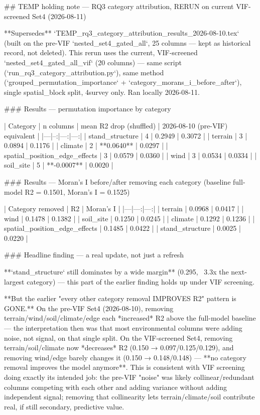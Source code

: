 ## TEMP holding note — RQ3 category attribution, RERUN on current VIF-screened Set4 (2026-08-11)

**Supersedes** `TEMP_rq3_category_attribution_results_2026-08-10.tex` (built on the pre-VIF
`nested_set4_gated_all`, 25 columns — kept as historical record, not deleted). This rerun uses
the current, VIF-screened `nested_set4_gated_all_vif` (20 columns) — same script
(`run_rq3_category_attribution.py`), same method (`grouped_permutation_importance` +
`category_morans_i_before_after`), single spatial_block split, 4survey only. Ran locally
2026-08-11.

### Results — permutation importance by category

| Category | n columns | mean R2 drop (shuffled) | 2026-08-10 (pre-VIF) equivalent |
|---|--:|---:|---:|
| stand_structure | 4 | 0.2949 | 0.3072 |
| terrain | 3 | 0.0894 | 0.1176 |
| climate | 2 | **0.0640** | 0.0297 |
| spatial_position_edge_effects | 3 | 0.0579 | 0.0360 |
| wind | 3 | 0.0534 | 0.0334 |
| soil_site | 5 | **-0.0007** | 0.0020 |

### Results — Moran's I before/after removing each category (baseline full-model R2 = 0.1501, Moran's I = 0.1525)

| Category removed | R2 | Moran's I |
|---|---:|---:|
| terrain | 0.0968 | 0.0417 |
| wind | 0.1478 | 0.1382 |
| soil_site | 0.1250 | 0.0245 |
| climate | 0.1292 | 0.1236 |
| spatial_position_edge_effects | 0.1485 | 0.0422 |
| stand_structure | 0.0025 | 0.0220 |

### Headline finding — a real update, not just a refresh

**`stand_structure` still dominates by a wide margin** (0.295, ~3.3x the next-largest category) —
this part of the earlier finding holds up under VIF screening.

**But the earlier "every other category removal IMPROVES R2" pattern is GONE.** On the pre-VIF
Set4 (2026-08-10), removing terrain/wind/soil/climate/edge each *increased* R2 above the
full-model baseline — the interpretation then was that most environmental columns were adding
noise, not signal, on that single split. On the VIF-screened Set4, removing terrain/soil/climate
now *decreases* R2 (0.150 → 0.097/0.125/0.129), and removing wind/edge barely changes it (0.150 →
0.148/0.148) — **no category removal improves the model anymore**. This is consistent with VIF
screening doing exactly its intended job: the pre-VIF "noise" was likely collinear/redundant
columns competing with each other and adding variance without adding independent signal; removing
that collinearity lets terrain/climate/soil contribute real, if still secondary, predictive value.

